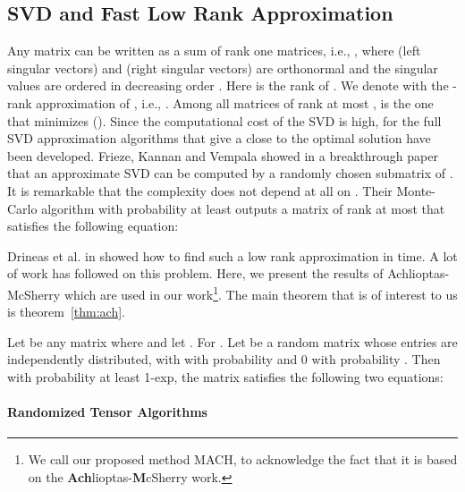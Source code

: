 \subsection{SVD and Fast Low Rank Approximation} 

Any matrix   can be written as a sum of rank one matrices, i.e.,
,
where  (left singular vectors) and  (right singular vectors) 
are orthonormal and the singular values are ordered in decreasing order
. Here  is the rank of . 
We denote with  the -rank approximation of , i.e., . 
Among all matrices  of rank at most , 
 is the one that minimizes  (\cite{Horn:1985:MA}).
Since the computational cost of the SVD is high,  for the full SVD 
approximation algorithms that give a close to the optimal solution  have been developed. 
Frieze, Kannan and Vempala showed in a breakthrough paper \cite{1039494} that an approximate SVD 
can be computed by a randomly chosen submatrix of . It is remarkable that the complexity
does not depend at all on . Their Monte-Carlo algorithm with probability at least  
outputs a matrix  of rank at most  
that satisfies the following equation: 

Drineas et al. in \cite{petros} showed how to find such a low rank approximation in  time. 
A lot of work has followed on this problem. Here, we present the results of Achlioptas-McSherry \cite{Achlioptas01fastcomputation} 
which are used in our work\footnote{We call our proposed method MACH, to acknowledge the fact that 
it is based on the \textbf{Ach}lioptas-\textbf{M}cSherry work. }. The main theorem that is of interest to us is theorem~\ref{thm:ach}.



\begin{theorem}
Let  be any  matrix where  and let .
For .
Let  be a random  matrix whose entries are independently distributed, with 
 with probability  and 0 with probability . 
Then with probability at least 1-exp, the matrix  satisfies the following two equations:

 



\label{thm:ach}
\end{theorem}


\paragraph{Randomized Tensor Algorithms}

